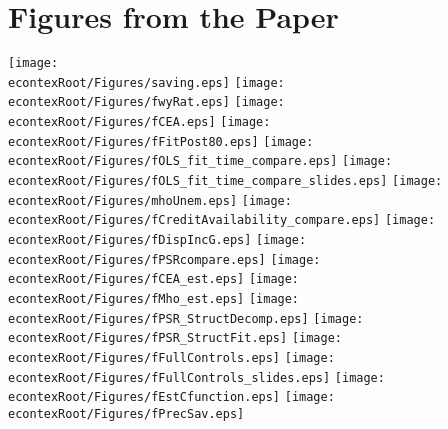 \section{Figures from the Paper}
\texttt{[image: \\econtexRoot/Figures/saving.eps]}
\texttt{[image: \\econtexRoot/Figures/fwyRat.eps]}
\texttt{[image: \\econtexRoot/Figures/fCEA.eps]}
\texttt{[image: \\econtexRoot/Figures/fFitPost80.eps]}
\texttt{[image: \\econtexRoot/Figures/fOLS\_fit\_time\_compare.eps]}
\texttt{[image: \\econtexRoot/Figures/fOLS\_fit\_time\_compare\_slides.eps]}
\texttt{[image: \\econtexRoot/Figures/mhoUnem.eps]}
\texttt{[image: \\econtexRoot/Figures/fCreditAvailability\_compare.eps]}
\texttt{[image: \\econtexRoot/Figures/fDispIncG.eps]}
\texttt{[image: \\econtexRoot/Figures/fPSRcompare.eps]}
\texttt{[image: \\econtexRoot/Figures/fCEA\_est.eps]}
\texttt{[image: \\econtexRoot/Figures/fMho\_est.eps]}
\texttt{[image: \\econtexRoot/Figures/fPSR\_StructDecomp.eps]}
\texttt{[image: \\econtexRoot/Figures/fPSR\_StructFit.eps]}
\texttt{[image: \\econtexRoot/Figures/fFullControls.eps]}
\texttt{[image: \\econtexRoot/Figures/fFullControls\_slides.eps]}
\texttt{[image: \\econtexRoot/Figures/fEstCfunction.eps]}
\texttt{[image: \\econtexRoot/Figures/fPrecSav.eps]}

